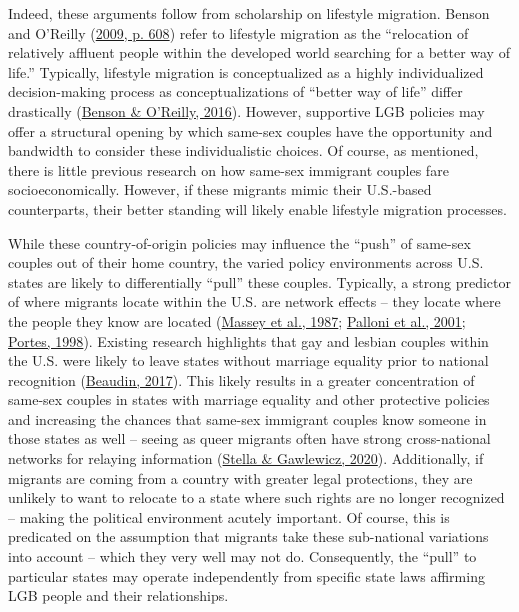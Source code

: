 \documentclass[
  11pt,
]{article}
\begin{document}
Indeed, these arguments follow from scholarship on lifestyle migration. Benson and O'Reilly (\protect\hyperlink{ref-benson_2009}{2009, p. 608}) refer to lifestyle migration as the ``relocation of relatively affluent people within the developed world searching for a better way of life.'' Typically, lifestyle migration is conceptualized as a highly individualized decision-making process as conceptualizations of ``better way of life'' differ drastically (\protect\hyperlink{ref-benson_2016}{Benson \& O'Reilly, 2016}). However, supportive LGB policies may offer a structural opening by which same-sex couples have the opportunity and bandwidth to consider these individualistic choices. Of course, as mentioned, there is little previous research on how same-sex immigrant couples fare socioeconomically. However, if these migrants mimic their U.S.-based counterparts, their better standing will likely enable lifestyle migration processes.

While these country-of-origin policies may influence the ``push'' of same-sex couples out of their home country, the varied policy environments across U.S. states are likely to differentially ``pull'' these couples. Typically, a strong predictor of where migrants locate within the U.S. are network effects -- they locate where the people they know are located (\protect\hyperlink{ref-massey_1987}{Massey et al., 1987}; \protect\hyperlink{ref-palloni_2001}{Palloni et al., 2001}; \protect\hyperlink{ref-portes_1998}{Portes, 1998}). Existing research highlights that gay and lesbian couples within the U.S. were likely to leave states without marriage equality prior to national recognition (\protect\hyperlink{ref-beaudin_2017}{Beaudin, 2017}). This likely results in a greater concentration of same-sex couples in states with marriage equality and other protective policies and increasing the chances that same-sex immigrant couples know someone in those states as well -- seeing as queer migrants often have strong cross-national networks for relaying information (\protect\hyperlink{ref-stella_2020}{Stella \& Gawlewicz, 2020}). Additionally, if migrants are coming from a country with greater legal protections, they are unlikely to want to relocate to a state where such rights are no longer recognized -- making the political environment acutely important. Of course, this is predicated on the assumption that migrants take these sub-national variations into account -- which they very well may not do. Consequently, the ``pull'' to particular states may operate independently from specific state laws affirming LGB people and their relationships.
\end{document}
